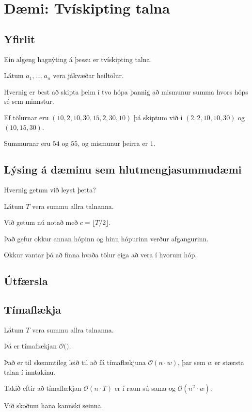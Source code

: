 \section{Dæmi: Tvískipting talna}
\subsection{Yfirlit}
{
    {
        \item<1-> Ein algeng hagnýting á þessu er tvískipting talna.
        \item<2-> Látum $a_1, \dots, a_n$ vera jákvæðar heiltölur.
        \item<3-> Hvernig er best að skipta þeim í tvo hópa þannig að mismunur summa hvors hóps sé sem minnstur.
        \item<4-> Ef tölurnar eru $(10, 2, 10, 30, 15, 2, 30, 10)$ þá skiptum við í $(2, 2, 10, 10, 30)$ og $(10, 15, 30)$.
        \item<5-> Summurnar eru $54$ og $55$, og mismunur þeirra er $1$.
    }
}


\subsection{Lýsing á dæminu sem hlutmengjasummudæmi}
{
    {
        \item<1-> Hvernig getum við leyst þetta?
        \item<2-> Látum $T$ vera summu allra talnanna.
        \item<3-> Við getum nú notað  með $c = \lfloor T/2 \rfloor$.
        \item<4-> Það gefur okkur annan hópinn og hinn hópurinn verður afgangurinn.
        \item<5-> Okkur vantar þó að finna hvaða tölur eiga að vera í hvorum hóp.
    }
}

\subsection{Útfærsla}
{
}

\subsection{Tímaflækja}
{
    {
        \item<1-> Látum $T$ vera summu allra talnanna.
        \item<2-> Þá er tímaflækjan $\mathcal{O}($$)$.
        \item<4-> Það er til skemmtileg leið til að fá tímaflækjuna $\mathcal{O}(n \cdot w)$, þar sem $w$ er stærsta talan í inntakinu.
        \item<5-> Takið eftir að tímaflækjan $\mathcal{O}(n \cdot T)$ er í raun sú sama og $\mathcal{O}(n^2 \cdot w)$.
        \item<6-> Við skoðum hana kannski seinna.
    }
}

